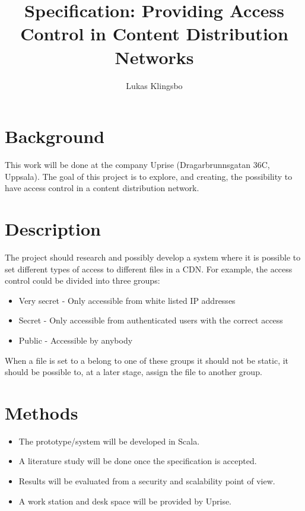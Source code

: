 \documentclass[a4paper,12pt]{article}
\title{\textbf{Specification: Providing Access Control in Content Distribution Networks}}
\author{Lukas Klingsbo}
\begin{document}
\maketitle

\setcounter{tocdepth}{3}
\tableofcontents

\clearpage
{}
\setcounter{page}{1}
\section{Background}
This work will be done at the company Uprise (Dragarbrunnsgatan 36C, Uppsala). 
The goal of this project is to explore, and creating, the possibility to have 
access control in a content distribution network.

\section{Description}
The project should research and possibly develop a system where it is possible 
to set different types of access to different files in a CDN. 
For example, the access control could be divided into three groups:
\begin{itemize}
  \item Very secret - Only accessible from white listed IP addresses
  \item Secret - Only accessible from authenticated users with the correct access
  \item Public - Accessible by anybody
\end{itemize}

When a file is set to a belong to one of these groups it should not be static, 
it should be possible to, at a later stage, assign the file to another group.

\section{Methods}
\begin{itemize}
  \item The prototype/system will be developed in Scala. 
  \item A literature study will be done once the specification is accepted. 
  \item Results will be evaluated from a security and scalability point of view. 
  \item A work station and desk space will be provided by Uprise.
\end{itemize}
\end{document}
